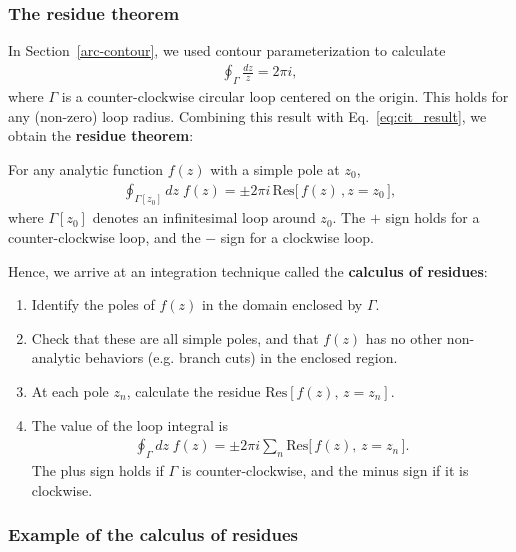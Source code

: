 \documentclass[10pt,a4paper]{article}
\begin{document}
\subsubsection{The residue theorem}
\label{the-residue-theorem}

In Section~\ref{arc-contour}, we used contour parameterization to
calculate
\begin{align}
  \oint_{\Gamma} \frac{dz}{z} = 2\pi i,
\end{align}
where $\Gamma$ is a counter-clockwise circular loop centered on the
origin. This holds for any (non-zero) loop radius.  Combining this
result with Eq.~\eqref{eq:cit_result}, we obtain the \textbf{residue
  theorem}:

\begin{framed}
  \noindent
  For any analytic function $f(z)$ with a simple pole at $z_0$,
  \begin{align}
    \oint_{\Gamma[z_0]} dz \; f(z) = \pm 2\pi i \, \mathrm{Res}\big[\,f(z)\,, z = z_0 \,\big],
  \end{align}
  where $\Gamma[z_0]$ denotes an infinitesimal loop around $z_0$.  The
  $+$ sign holds for a counter-clockwise loop, and the $-$ sign for a
  clockwise loop.
\end{framed}

\noindent
Hence, we arrive at an integration technique called the
\textbf{calculus of residues}:

\begin{enumerate}
\item Identify the poles of $f(z)$ in the domain enclosed by $\Gamma$.

\item Check that these are all simple poles, and that $f(z)$ has no other non-analytic behaviors (e.g. branch cuts) in the enclosed region.

\item At each pole $z_n$, calculate the residue $\mathrm{Res}[f(z),\, z = z_n]$.

\item The value of the loop integral is
  \begin{align}
    \oint_\Gamma dz\; f(z) = \pm 2\pi i \sum_n \mathrm{Res}\big[\,f(z),\,z = z_n\,\big].
  \end{align}
  The plus sign holds if $\Gamma$ is counter-clockwise, and the minus
  sign if it is clockwise.
\end{enumerate}

\subsubsection{Example of the calculus of residues}
\label{residues-example}
\end{document}
